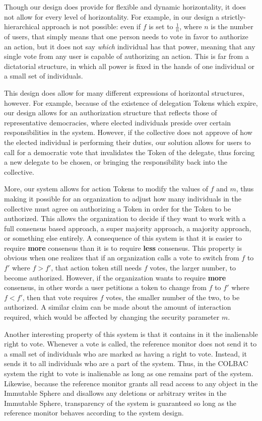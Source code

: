Though our design does provide for flexible and dynamic horizontality, it does
not allow for every level of horizontality. For example, in our design a
strictly-hierarchical approach is not possible: even if $f$ is set to
$\frac{1}{n}$, where $n$ is the number of users, that simply means that one
person needs to vote in favor to authorize an action, but it does not say
\textit{which} individual has that power, meaning that any single vote from any
user is capable of authorizing an action. This is far from a dictatorial
structure, in which all power is fixed in the hands of one individual or a small set of
individuals.

This design does allow for many different expressions of horizontal structures,
however. For example, because of the existence of delegation Tokens which expire,
our design allows for an authorization structure that reflects those of
representative democracies, where elected individuals preside over certain
responsibilities in the system. However, if the collective does not approve of
how the elected individual is performing their duties, our solution allows for
users to call for a democratic vote that invalidates the Token of the delegate,
thus forcing a new delegate to be chosen, or bringing the responsibility back
into the collective.

More, our system allows for action Tokens to modify the values of $f$ and $m$,
thus making it possible for an organization to adjust how many individuals in
the collective must agree on authorizing a Token in order for the Token to be
authorized. This allows the organization to decide if they want to work with
a full consensus based approach, a super majority approach, a majority approach,
or something else entirely. A consequence of this system is that it is easier to
require \textbf{more} consensus than it is to require \textbf{less} consensus.
This property is obvious when one realizes that if an organization calls a vote
to switch from $f$ to $f'$ where $f > f'$, that action token still needs $f$
votes, the larger number, to become authorized. However, if the organization
wants to require \textbf{more} consensus, in other words a user petitions a
token to change from $f$ to $f'$ where $f < f'$, then that vote requires $f$
votes, the smaller number of the two, to be authorized. A similar claim can be
made about the amount of interaction required, which would be affected by
changing the security parameter $m$.

Another interesting property of this system is that it contains in it the
inalienable right to vote. Whenever a vote is called, the reference monitor does
not send it to a small set of individuals who are marked as having a right to
vote. Instead, it sends it to all individuals who are a part of the system.
Thus, in the COLBAC system the right to vote is inalienable as long as one
remains part of the system. Likewise, because the reference monitor grants all
read access to any object in the Immutable Sphere and disallows any deletions or
arbitrary writes in the Immutable Sphere, transparency of the system is
guaranteed so long as the reference monitor behaves according to the system
design.

